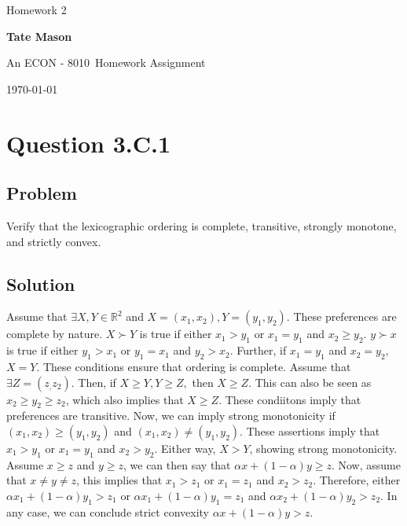 \documentclass[10pt, a4paper]{article}
\newcommand\course{ECON - 8010}                            %
\newcommand\hwnumber{ 2}                                 %
\newcommand\Information{Tate Mason}                        %
\begin{document}
  \begin{titlepage}
    \begin{center}
      \vspace*{3cm}
            
        \vspace{1cm}
        \huge
        Homework \hwnumber
            
        \vspace{1.5cm}
        \Large
            
        \textbf{\Information}                      %
            
        \vfill
        
        An \course \ Homework Assignment
            
        \vspace{1cm}
        \Large

        
        \today
            
    \end{center}
  \end{titlepage}

  \newpage

  \section{Question 3.C.1}
    \subsection{Problem}
      Verify that the lexicographic ordering is complete, transitive, strongly monotone, and strictly convex.
    \subsection{Solution}
    Assume that $\exists X,Y\in\mathbb{R}^2$ and $X=(x_1,x_2), Y=(y_1,y_2)$. These preferences are complete by nature. $X\succ Y$ is true if either $x_1>y_1$ or $x_1=y_1$ and $x_2\geq y_2$. $y\succ x$ is true if either $y_1>x_1$ or $y_1=x_1$ and $y_2>x_2$. Further, if $x_1=y_1$ and $x_2=y_2$, $X=Y$. These conditions ensure that ordering is complete. Assume that $\exists Z=(z_,z_2)$. Then, if $X\geq Y, Y\geq Z,$ then $X\geq Z$. This can also be seen as $x_2\geq y_2\geq z_2$, which also implies that $X\geq Z$. These condiitons imply that preferences are transitive. Now, we can imply strong monotonicity if $(x_1,x_2)\geq(y_1,y_2)$ and $(x_1,x_2)\ne(y_1,y_2)$. These assertions imply that $x_1>y_1$ or $x_1=y_1$ and $x_2>y_2$. Either way, $X>Y$, showing strong monotonicity. Assume $x\geq z$ and $y\geq z$, we can then say that $\alpha x+(1-\alpha)y\geq z$. Now, assume that $x\ne y\ne z$, this implies that $x_1>z_1$ or $x_1=z_1$ and $x_2>z_2$. Therefore, either $\alpha x_1 +(1-\alpha)y_1>z_1$ or $\alpha x_1 +(1-\alpha)y_1=z_1$ and $\alpha x_2 +(1-\alpha)y_2>z_2$. In any case, we can conclude strict convexity $\alpha x+(1-\alpha)y>z$. 
\end{document}
